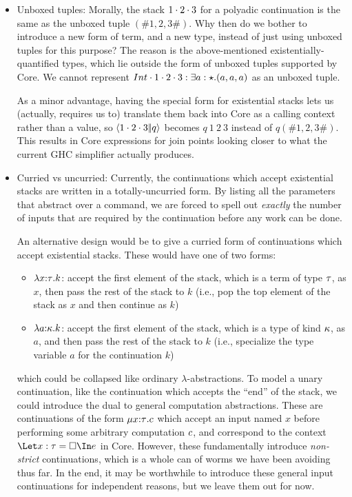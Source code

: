 \documentclass{article}
\begin{document}
\begin{itemize}
\item Unboxed tuples: Morally, the stack ${1}\cdot{{2}\cdot{3}}$ for a polyadic
  continuation is the same as the unboxed tuple $(\# 1, 2, 3 \#)$.  Why then do
  we bother to introduce a new form of term, and a new type, instead of just
  using unboxed tuples for this purpose?  The reason is the above-mentioned
  existentially-quantified types, which lie outside the form of unboxed tuples
  supported by Core.  We cannot represent
  $\packrets[\stackty{a:\star}{a, a, a}]{\pack{Int}{\pack{1}{\pack{2}{3}}}}$ as
  an unboxed tuple.

  As a minor advantage, having the special form for existential stacks lets us
  (actually, requires us to) translate them back into Core as a calling context
  rather than a value, so $\left\langle{{1}\cdot{{2}\cdot{3}}}\middle|\!\middle|{q}\right\rangle$ becomes $q ~ 1 ~ 2 ~ 3$
  instead of $q (\# 1, 2, 3 \#)$.  This results in Core expressions for join
  points looking closer to what the current GHC simplifier actually produces.

\item Curried vs uncurried: Currently, the continuations which accept
  existential stacks are written in a totally-uncurried form.  By listing all
  the parameters that abstract over a command, we are forced to spell out
  \emph{exactly} the number of inputs that are required by the continuation
  before any work can be done.

  An alternative design would be to give a curried form of continuations which
  accept existential stacks.  These would have one of two forms:
  \begin{itemize}
  \item $\lambda{x{:}{\tau}}.k$: accept the first element of the stack, which is a
    term of type $\tau$, as $x$, then pass the rest of the stack to $k$ (i.e.,
    pop the top element of the stack as $x$ and then continue as $k$)
  \item $\lambda{a{:}{\kappa}}.k$: accept the first element of the stack, which is a
    type of kind $\kappa$, as $a$, and then pass the rest of the stack to $k$
    (i.e., specialize the type variable $a$ for the continuation $k$)
  \end{itemize}
  which could be collapsed like ordinary $\lambda$-abstractions.  To model a
  unary continuation, like the continuation which accepts the ``end'' of the
  stack, we could introduce the dual to general computation abstractions.  These
  are continuations of the form $\mu{x{:}{\tau}}.c$ which accept an input
  named $x$ before performing some arbitrary computation $c$, and correspond
  to the context $\Let x:\ty = \hole \In \expr$ in Core.  However, these
  fundamentally introduce \emph{non-strict} continuations, which is a whole can
  of worms we have been avoiding thus far.  In the end, it may be worthwhile to
  introduce these general input continuations for independent reasons, but we
  leave them out for now.


\end{itemize}
\end{document}
